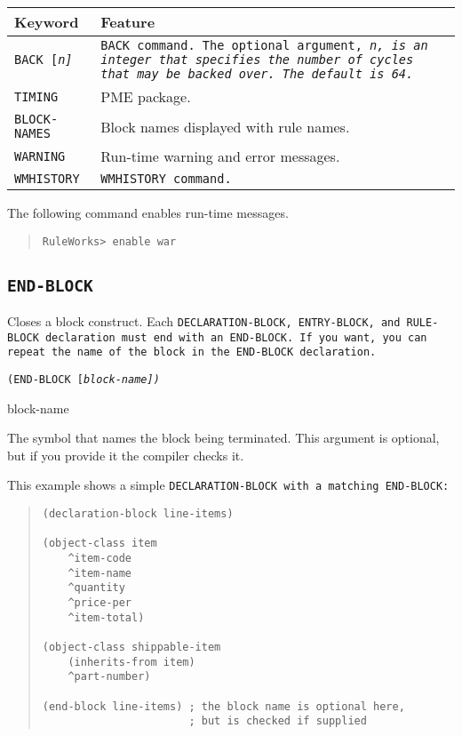 \begin{tabularx}{\columnwidth}{lX}
  \toprule
  Keyword     & Feature \\
  \midrule
  \tt{BACK} [\it{n}] & \tt{BACK} command. The optional argument, \it{n}, is  
                       an integer that specifies the number of    
                       cycles that may be backed over. The default 
                       is 64. \\
  \tt{TIMING} &  PME package. \\
  \tt{BLOCK-NAMES} & Block names displayed with rule names. \\
  \tt{WARNING} & Run-time warning and error messages. \\
  \tt{WMHISTORY} & \tt{WMHISTORY} command. \\
  \bottomrule
\end{tabularx}

\Example

The following command enables run-time messages.

\begin{quote}
\begin{verbatim}
RuleWorks> enable war
\end{verbatim}
\end{quote}

\subsection{\tt{END-BLOCK}}

Closes a block construct. Each \tt{DECLARATION-BLOCK},
\tt{ENTRY-BLOCK}, and \tt{RULE-BLOCK} declaration must end with an
\tt{END-BLOCK}. If you want, you can repeat the name of the block in
the \tt{END-BLOCK} declaration.

\Format

\tt{(END-BLOCK} [\it{block-name}]\tt{)}

\begin{arguments}

\item[block-name]

  The symbol that names the block being terminated. This argument is
  optional, but if you provide it the compiler checks it.
\end{arguments}

\Example

This example shows a simple \tt{DECLARATION-BLOCK} with a matching
\tt{END-BLOCK}:
\begin{quote}
\begin{verbatim}
(declaration-block line-items)

(object-class item
    ^item-code
    ^item-name
    ^quantity
    ^price-per
    ^item-total)

(object-class shippable-item
    (inherits-from item)
    ^part-number)

(end-block line-items) ; the block name is optional here,
                       ; but is checked if supplied
\end{verbatim}
\end{quote}
                     
